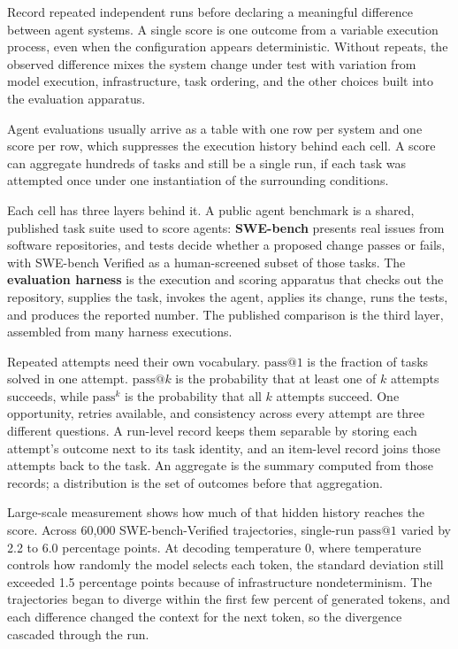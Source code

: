 Record repeated independent runs before declaring a meaningful difference between agent systems. A single score is one outcome from a variable execution process, even when the configuration appears deterministic. Without repeats, the observed difference mixes the system change under test with variation from model execution, infrastructure, task ordering, and the other choices built into the evaluation apparatus.

Agent evaluations usually arrive as a table with one row per system and one score per row, which suppresses the execution history behind each cell. A score can aggregate hundreds of tasks and still be a single run, if each task was attempted once under one instantiation of the surrounding conditions.

Each cell has three layers behind it. A public agent benchmark is a shared, published task suite used to score agents: \textbf{SWE-bench} presents real issues from software repositories, and tests decide whether a proposed change passes or fails, with SWE-bench Verified as a human-screened subset of those tasks. The \textbf{evaluation harness} is the execution and scoring apparatus that checks out the repository, supplies the task, invokes the agent, applies its change, runs the tests, and produces the reported number. The published comparison is the third layer, assembled from many harness executions.

Repeated attempts need their own vocabulary. \(\mathrm{pass}@1\) is the fraction of tasks solved in one attempt. \(\mathrm{pass}@k\) is the probability that at least one of \(k\) attempts succeeds, while \(\mathrm{pass}^{k}\) is the probability that all \(k\) attempts succeed. One opportunity, retries available, and consistency across every attempt are three different questions. A run-level record keeps them separable by storing each attempt's outcome next to its task identity, and an item-level record joins those attempts back to the task. An aggregate is the summary computed from those records; a distribution is the set of outcomes before that aggregation.

Large-scale measurement shows how much of that hidden history reaches the score. Across 60,000 SWE-bench-Verified trajectories, single-run \(\mathrm{pass}@1\) varied by 2.2 to 6.0 percentage points. At decoding temperature 0, where temperature controls how randomly the model selects each token, the standard deviation still exceeded 1.5 percentage points because of infrastructure nondeterminism. The trajectories began to diverge within the first few percent of generated tokens, and each difference changed the context for the next token, so the divergence cascaded through the run.

